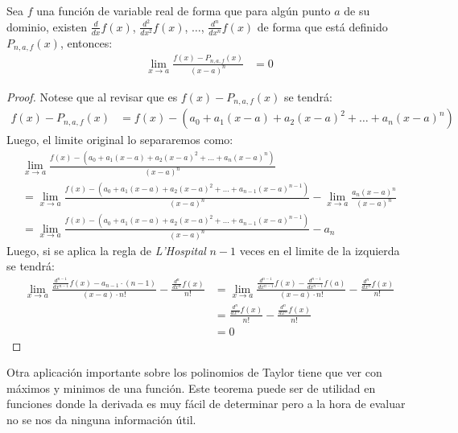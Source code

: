 \documentclass[12pt,a4paper,oneside]{memoir}
\begin{document}
\begin{theorem}
    Sea $f$ una función de variable real de forma que para algún punto $a$ de su dominio, existen $\frac{d}{dx} f(x)$, $\frac{d^2}{dx^2} f(x)$, $\dots$, $\frac{d^n}{dx^n} f(x)$ de forma que está definido $P_{n, a, f}(x)$, entonces:
    \begin{align*}
        \lim_{x \to a} \frac{f(x) - P_{n, a, f}(x)}{(x-a)^n} &= 0
    \end{align*}
\end{theorem}
\begin{proof}
    Notese que al revisar que es $f(x) - P_{n, a, f}(x)$ se tendrá:
    \begin{align*}
        f(x) - P_{n, a, f}(x) &= f(x) - (a_0 + a_1(x-a) + a_2(x-a)^2 + \dots + a_n(x-a)^n)
    \end{align*}
    Luego, el limite original lo separaremos como:
    \begin{align*}
        \lim_{x \to a} \frac{f(x) - (a_0 + a_1(x-a) + a_2(x-a)^2 + \dots + a_n(x-a)^n)}{(x-a)^n}\\= \lim_{x \to a} \frac{f(x) - (a_0 + a_1(x-a) + a_2(x-a)^2 + \dots + a_{n-1}(x-a)^{n-1})}{(x-a)^n} - \lim_{x \to a} \frac{a_n(x-a)^n}{(x-a)^n}
        \\= \lim_{x \to a} \frac{f(x) - (a_0 + a_1(x-a) + a_2(x-a)^2 + \dots + a_{n-1}(x-a)^{n-1})}{(x-a)^n} - a_n
    \end{align*}
    Luego, si se aplica la regla de \textit{L'Hospital} $n-1$ veces en el limite de la izquierda se tendrá:
    \begin{align*}
        \lim_{x \to a} \frac{\frac{d^{n-1}}{dx^{n-1}}f(x) - a_{n-1} \cdot (n-1)}{(x-a)\cdot n!} - \frac{\frac{d^n}{dx^n} f(x)}{n!} &= \lim_{x \to a} \frac{\frac{d^{n-1}}{dx^{n-1}}f(x) - \frac{d^{n-1}}{dx^{n-1}} f(a)}{(x-a)\cdot n!} - \frac{\frac{d^n}{dx^n} f(x)}{n!}\\
        &= \frac{\frac{d^n}{dx^n} f(x)}{n!} - \frac{\frac{d^n}{dx^n} f(x)}{n!}\\
        &= 0
    \end{align*}
\end{proof}

Otra aplicación importante sobre los polinomios de Taylor tiene que ver con máximos y minimos de una función. Este teorema puede ser de utilidad en funciones donde la derivada es muy fácil de determinar pero a la hora de evaluar no se nos da ninguna información útil.
\end{document}
